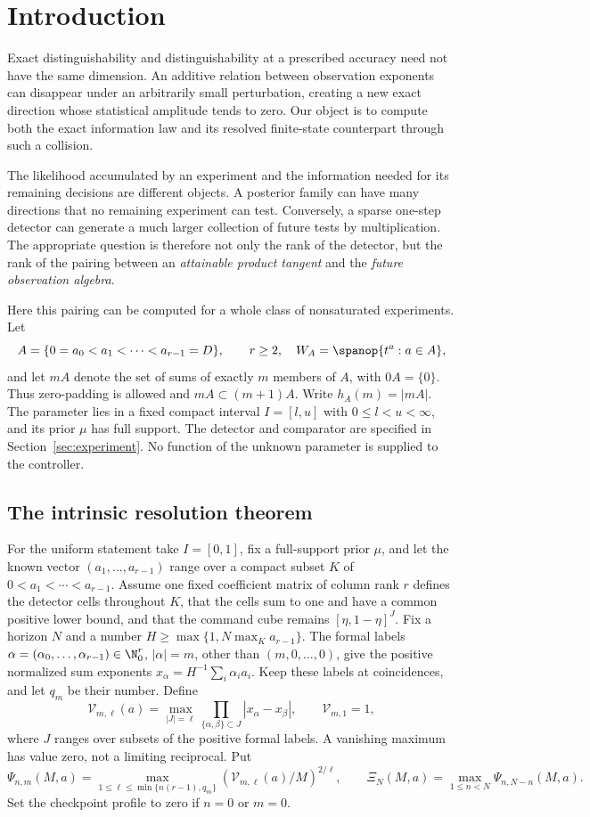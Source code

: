 \section{Introduction}
Exact distinguishability and distinguishability at a prescribed accuracy need
not have the same dimension. An additive relation between observation
exponents can disappear under an arbitrarily small perturbation, creating
a new exact direction whose statistical amplitude tends to zero. Our
object is to compute both the exact information law and its resolved
finite-state counterpart through such a collision.

The likelihood accumulated by an experiment and the information needed
for its remaining decisions are different objects. A posterior family can
have many directions that no remaining experiment can test. Conversely,
a sparse one-step detector can generate a much larger collection of
future tests by multiplication. The appropriate question is therefore not
only the rank of the detector, but the rank of the pairing between an
\emph{attainable product tangent} and the \emph{future observation algebra}.

Here this pairing can be computed for a whole class of nonsaturated
experiments. Let
\[
 A=\{0=a_0<a_1<\cdots<a_{r-1}=D\},\qquad r\ge2,
 \quad W_A=\spanop\{t^a:a\in A\},
\]
and let $mA$ denote the set of sums of exactly $m$ members of $A$, with
$0A=\{0\}$. Thus zero-padding is allowed and $mA\subset(m+1)A$.
Write $h_A(m)=|mA|$. The parameter lies in a fixed compact interval
$I=[l,u]$ with $0\le l<u<\infty$, and its prior $\mu$ has full support.
The detector and comparator are specified in Section~\ref{sec:experiment}.
No function of the unknown parameter is supplied to the controller.


\subsection{The intrinsic resolution theorem}
For the uniform statement take $I=[0,1]$, fix a full-support prior $\mu$,
and let the known vector $(a_1,\ldots,a_{r-1})$ range over a compact
subset $K$ of $0<a_1<\cdots<a_{r-1}$. Assume one fixed coefficient
matrix of column rank $r$ defines the detector cells throughout $K$,
that the cells sum to one and have a common positive lower bound, and
that the command cube remains $[\eta,1-\eta]^J$. Fix a horizon $N$
and a number $H\ge\max\{1,N\max_Ka_{r-1}\}$. The formal labels
$\alpha=(\alpha_0,\ldots,\alpha_{r-1})\in\N_0^r$, $|\alpha|=m$,
other than $(m,0,\ldots,0)$, give the positive normalized sum exponents
$x_\alpha=H^{-1}\sum_i\alpha_i a_i$. Keep these labels at coincidences,
and let $q_m$ be their number. Define
\[
 \mathcal V_{m,\ell}(a)=
   \max_{|J|=\ell}\prod_{\{\alpha,\beta\}\subset J}
           |x_\alpha-x_\beta|,\qquad
 \mathcal V_{m,1}=1,
\]
where $J$ ranges over subsets of the positive formal labels. A vanishing
maximum has value zero, not a limiting reciprocal. Put
\[
 \Psi_{n,m}(M,a)=
 \max_{1\le\ell\le\min\{n(r-1),q_m\}}
       (\mathcal V_{m,\ell}(a)/M)^{2/\ell},\qquad
 \Xi_N(M,a)=\max_{1\le n<N}\Psi_{n,N-n}(M,a).
\]
Set the checkpoint profile to zero if $n=0$ or $m=0$.

